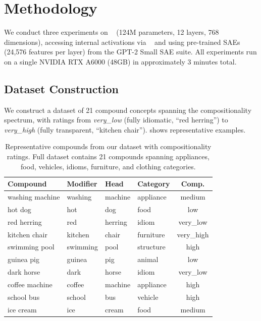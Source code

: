 \section{Methodology}
\label{sec:methodology}

We conduct three experiments on \gpttwo~\citep{radford2019language} (124M parameters, 12 layers, 768 dimensions), accessing internal activations via \transformerlens~\citep{nanda2022transformerlens} and using pre-trained SAEs (24,576 features per layer) from the GPT-2 Small SAE suite.
All experiments run on a single NVIDIA RTX A6000 (48GB) in approximately 3 minutes total.

\subsection{Dataset Construction}
\label{sec:dataset}

We construct a dataset of 21 compound concepts spanning the compositionality spectrum, with ratings from \emph{very\_low} (fully idiomatic, \eg ``red herring'') to \emph{very\_high} (fully transparent, \eg ``kitchen chair'').
 shows representative examples.

\begin{table}[t]
    \centering
    \begin{tabular}{@{}llllc@{}}
        \toprule
        \textbf{Compound} & \textbf{Modifier} & \textbf{Head} & \textbf{Category} & \textbf{Comp.} \\
        \midrule
        washing machine & washing & machine & appliance & medium \\
        hot dog & hot & dog & food & low \\
        red herring & red & herring & idiom & very\_low \\
        kitchen chair & kitchen & chair & furniture & very\_high \\
        swimming pool & swimming & pool & structure & high \\
        guinea pig & guinea & pig & animal & low \\
        dark horse & dark & horse & idiom & very\_low \\
        coffee machine & coffee & machine & appliance & high \\
        school bus & school & bus & vehicle & high \\
        ice cream & ice & cream & food & medium \\
        \bottomrule
    \end{tabular}
    \caption{Representative compounds from our dataset with compositionality ratings. Full dataset contains 21 compounds spanning appliances, food, vehicles, idioms, furniture, and clothing categories.}
    \label{tab:compounds}
\end{table}

